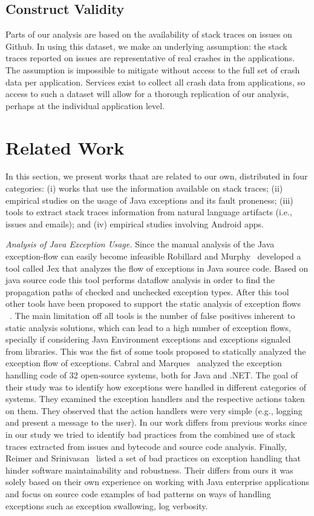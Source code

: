 \documentclass[conference]{IEEEtran}
\begin{document}
\subsection{Construct Validity}
Parts of our analysis are based on the availability of stack traces on issues on
Github. In using this dataset, we make an underlying assumption: the
stack traces reported on issues are representative of real crashes in 
the applications. The assumption is impossible to mitigate without access to 
the full set of crash data per application. Services exist to collect all
crash data from applications, so access to such a dataset will allow for
a thorough replication of our analysis, perhaps at the individual application 
level. 

\section{Related Work}

In this section, we present works thaat are related to our own, distributed in four categories: (i) works that use the information available on stack traces; (ii) empirical studies on the usage of Java exceptions and its fault proneness; (iii) tools to extract stack traces information from natural language artifacts (i.e., issues and emails);  and (iv) empirical studies involving Android apps.

\textit{Analysis of Java Exception Usage.} Since the manual analysis of the Java exception-flow can easily become infeasible Robillard and Murphy~\cite{Robil00} developed a tool called Jex that analyzes the flow of exceptions in Java source code. Based on java source code this tool performs dataflow analysis in order to find the propagation paths of checked and unchecked exception types. After this tool other tools have been proposed to support the static analysis of exception flows ~\cite{fu2007exception} ~\cite{coelho2008assessing}. The main limitation off all tools is the number of false positives inherent to static analysis solutions, which can lead to a high number of exception flows, specially if considering Java Environment exceptions and exceptions signaled from libraries. This was the fist of some tools proposed to statically analyzed the exception flow of exceptions. Cabral and Marques~\cite{cabral2007exception} analyzed the exception handling code of 32 open-source systems, both for Java and .NET. The goal of their study was to identify how exceptions were handled in different categories of systems. They examined the exception handlers and the respective actions taken on them. They observed that the action handlers were very simple (e.g., logging and present a message to the user). In our work differs from previous works since in our study we tried to identify bad practices from the combined use of stack traces extracted from issues and bytecode and source code analysis. Finally, Reimer and Srinivasan~\cite{reimer2003analyzing} listed a set of bad practices on exception handling that hinder software maintainability and robustness. Their differs from ours it was solely based on their own experience on working with Java enterprise applications and focus on source code examples of bad patterns on ways of handling exceptions such as exception swallowing, log verbosity.
\end{document}
